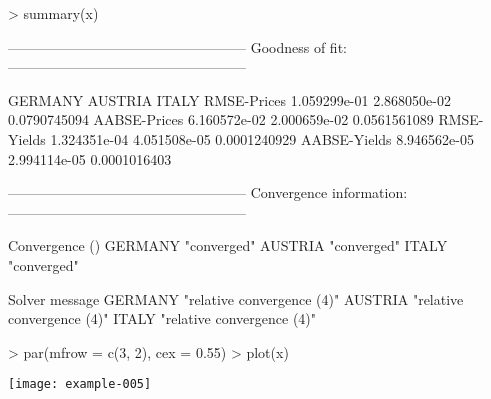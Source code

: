 \begin{Schunk}
\begin{Sinput}
> summary(x)
\end{Sinput}
\begin{Soutput}
---------------------------------------------------
Goodness of fit:
---------------------------------------------------

                  GERMANY      AUSTRIA        ITALY
RMSE-Prices  1.059299e-01 2.868050e-02 0.0790745094
AABSE-Prices 6.160572e-02 2.000659e-02 0.0561561089
RMSE-Yields  1.324351e-04 4.051508e-05 0.0001240929
AABSE-Yields 8.946562e-05 2.994114e-05 0.0001016403


---------------------------------------------------
Convergence information:
---------------------------------------------------

        Convergence ()
GERMANY "converged"   
AUSTRIA "converged"   
ITALY   "converged"   

        Solver message            
GERMANY "relative convergence (4)"
AUSTRIA "relative convergence (4)"
ITALY   "relative convergence (4)"
\end{Soutput}
\end{Schunk}

\begin{center}
\begin{Schunk}
\begin{Sinput}
> par(mfrow = c(3, 2), cex = 0.55)
> plot(x)
\end{Sinput}
\end{Schunk}
\texttt{[image: example-005]}
\end{center}
\normalsize







